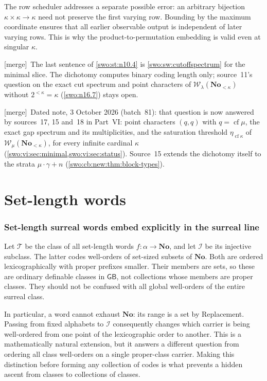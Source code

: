 \documentclass[11pt]{article}
\theoremstyle{definition}
\theoremstyle{remark}
\newcommand{\No}{\mathbf{No}}
\newcommand{\WO}{\mathcal W}
\newcommand{\Words}{\mathcal I}
\newcommand{\WordsAll}{\mathcal T}
\newcommand{\cf}{\operatorname{cf}}
\newcommand{\GB}{\mathsf{GB}}
\newcommand{\merge}{\textsf{[merge]}}
\begin{document}
The row scheduler addresses a separate possible error: an arbitrary
bijection $\kappa\times\kappa\to\kappa$ need not preserve the first
varying row. Bounding by the maximum coordinate ensures that all earlier
observable output is independent of later varying rows. This is why the
product-to-permutation embedding is valid even at singular $\kappa$.


\merge\ The last sentence of \cref{swo:st:n10.4} is \cref{swo:sw:cutoffspectrum}
for the minimal slice. The dichotomy computes binary coding length only;
source~11's question on the exact cut spectrum and point characters of
$\WO_\lambda(\No_{<\kappa})$ without $2^{<\kappa}=\kappa$ (\cref{swo:n16.7})
stays open.

\smallskip\noindent\merge\ Dated note, 3 October 2026 (batch~81): that question
is now answered by sources~17, 15 and~18 in Part~VI: point characters
$(q,q)$ with $q=\cf\mu$, the exact gap spectrum and its multiplicities, and
the saturation threshold $\eta_{\cf\kappa}$ of $\WO_\mu(\No_{<\kappa})$, for
every infinite cardinal $\kappa$ (\cref{swo:vi:sec:minimal,swo:vi:sec:status}).
Source~15 extends the dichotomy itself to the strata $\mu\cdot\gamma+n$
(\cref{swo:cb:new:thm:block-types}).

\part{Set-length words}\label{swo:part:words}

\section{Set-length surreal words embed explicitly in the surreal line}
\label{swo:sw:encoding}

Let \(\WordsAll\) be the class of all set-length words
\(f:\alpha\to\No\), and let \(\Words\) be its injective subclass.
The latter codes well-orders of set-sized subsets of \(\No\).
Both are ordered lexicographically with proper prefixes smaller.
Their members are sets, so these are ordinary definable classes
in \(\GB\), not collections whose members are proper classes.
They should not be confused with all global well-orders of
the entire surreal class.

In particular, a word cannot exhaust \(\No\): its range is
a set by Replacement.  Passing from fixed alphabets to
\(\Words\) consequently changes which carrier is being
well-ordered from one point of the lexicographic order to
another.  This is a mathematically natural extension, but
it answers a different question from ordering all class
well-orders on a single proper-class carrier.
Making this distinction before forming any collection of
codes is what prevents a hidden ascent from classes to
collections of classes.
\end{document}
